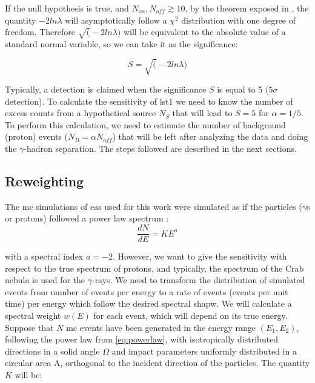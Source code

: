 \documentclass[main.tex]{subfiles}
\begin{document}
If the null hypothesis is true, and $N_{on}, N_{off} \gtrsim 10$, by the theorem exposed in \cite{1983LiMa}, the quantity $-2ln\lambda$ will asymptotically follow a $\chi^2$ distribution with one degree of freedom. Therefore $\sqrt(-2ln\lambda)$ will be equivalent to the absolute value of a standard normal variable, so we can take it as the significance:

\begin{equation}
  S = \sqrt(-2ln\lambda)
\end{equation}

Typically, a detection is claimed when the significance $S$ is equal to 5 ($5\sigma$ detection). To calculate the sensitivity of \gls{lst}1 we need to know the number of excess counts from a hypothetical source $N_{S}$ that will lead to $S=5$ for $\alpha=1/5$. \\
To perform this calculation, we need to estimate the number of background (proton) events ($N_{B} = \alpha N_{off}$) that will be left after analyzing the data and doing the $\gamma$-hadron separation. The steps followed are described in the next sections.

\subsection{Reweighting}

The \gls{mc} simulations of \gls{eas} used for this work were simulated as if the particles ($\gamma$s or protons) followed a power law spectrum
:
\begin{equation} \label{eq:powerlaw}
\frac{dN}{dE} = K E^{a}
\end{equation}

with a spectral index $a=-2$. However, we want to give the sensitivity with respect to the true spectrum of protons, and typically, the spectrum of the Crab nebula is used for the $\gamma$-rays. We need to transform the distribution of simulated events from number of events per energy to a rate of events (events per unit time) per energy which follow the desired spectral shapw. We will calculate a spectral weight $w(E)$ for each event, which will depend on its true energy.\\
Suppose that $N$ \gls{mc} events have been generated in the energy range $(E_1,E_2)$, following the power law from \ref{eq:powerlaw}, with isotropically distributed directions in a solid angle $\Omega$ and impact parameters uniformly distributed in a circular area A, orthogonal to the incident direction of the particles.
The quantity $K$ will be:
\end{document}
